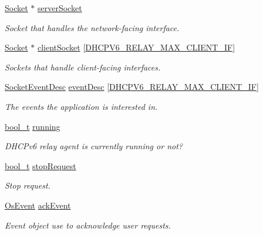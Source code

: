 \begin{DoxyCompactItemize}
\hyperlink{socket_8h_aa85acfb0fa336ef495e6ba87fb88fc48}{Socket} $\ast$ \hyperlink{structDhcpv6RelayContext_af1c015d0b8abef9419722312631a132d}{server\+Socket}
\begin{DoxyCompactList}\small\item\em Socket that handles the network-\/facing interface. \end{DoxyCompactList}\item 
\hyperlink{socket_8h_aa85acfb0fa336ef495e6ba87fb88fc48}{Socket} $\ast$ \hyperlink{structDhcpv6RelayContext_a356e927a8bf2bd0e9f434759945ea9c7}{client\+Socket} \mbox{[}\hyperlink{dhcpv6__relay_8h_a588f9db9b4638a3b196e1421ab1bf6dc}{D\+H\+C\+P\+V6\+\_\+\+R\+E\+L\+A\+Y\+\_\+\+M\+A\+X\+\_\+\+C\+L\+I\+E\+N\+T\+\_\+\+IF}\mbox{]}
\begin{DoxyCompactList}\small\item\em Sockets that handle client-\/facing interfaces. \end{DoxyCompactList}\item 
\hyperlink{structSocketEventDesc}{Socket\+Event\+Desc} \hyperlink{structDhcpv6RelayContext_a932752b59e55fb44d4151e350fbd09be}{event\+Desc} \mbox{[}\hyperlink{dhcpv6__relay_8h_a588f9db9b4638a3b196e1421ab1bf6dc}{D\+H\+C\+P\+V6\+\_\+\+R\+E\+L\+A\+Y\+\_\+\+M\+A\+X\+\_\+\+C\+L\+I\+E\+N\+T\+\_\+\+IF}\mbox{]}
\begin{DoxyCompactList}\small\item\em The events the application is interested in. \end{DoxyCompactList}\item 
\hyperlink{compiler__port_8h_a812d16e5494522586b3784e55d479912}{bool\+\_\+t} \hyperlink{structDhcpv6RelayContext_a4d6dd0abf3071d9e44c401004deef46b}{running}
\begin{DoxyCompactList}\small\item\em D\+H\+C\+Pv6 relay agent is currently running or not? \end{DoxyCompactList}\item 
\hyperlink{compiler__port_8h_a812d16e5494522586b3784e55d479912}{bool\+\_\+t} \hyperlink{structDhcpv6RelayContext_a6aacb68538ea15d3bd6be970a37ca5b6}{stop\+Request}
\begin{DoxyCompactList}\small\item\em Stop request. \end{DoxyCompactList}\item 
\hyperlink{structOsEvent}{Os\+Event} \hyperlink{structDhcpv6RelayContext_af3a40357f3522b48095aee5287ce085e}{ack\+Event}
\begin{DoxyCompactList}\small\item\em Event object use to acknowledge user requests. \end{DoxyCompactList}\item 

\end{DoxyCompactItemize}
